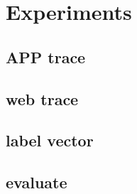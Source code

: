
\chapter{Experiments}\label{ch:experiments}


\section{APP trace}
\section{web trace}


\section{label vector}


\section{evaluate}